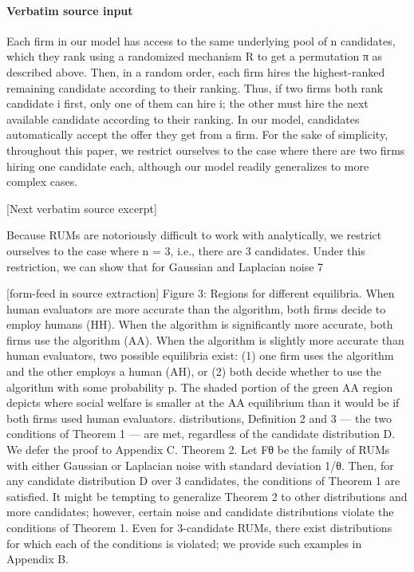 \documentclass[10pt]{article}
\begin{document}
\paragraph{Verbatim source input}
\begin{ReviewVerbatim}
Each firm in our model has access to the same underlying pool of n candidates, which they rank using
a randomized mechanism R to get a permutation π as described above. Then, in a random order, each
firm hires the highest-ranked remaining candidate according to their ranking. Thus, if two firms both rank
candidate i first, only one of them can hire i; the other must hire the next available candidate according to
their ranking. In our model, candidates automatically accept the offer they get from a firm. For the sake
of simplicity, throughout this paper, we restrict ourselves to the case where there are two firms hiring one
candidate each, although our model readily generalizes to more complex cases.

[Next verbatim source excerpt]

Because RUMs are notoriously difficult to work with analytically, we restrict ourselves to the case where
n = 3, i.e., there are 3 candidates. Under this restriction, we can show that for Gaussian and Laplacian noise
7


[form-feed in source extraction]
Figure 3: Regions for different equilibria. When human evaluators are more accurate than the algorithm,
both firms decide to employ humans (HH). When the algorithm is significantly more accurate, both firms
use the algorithm (AA). When the algorithm is slightly more accurate than human evaluators, two possible
equilibria exist: (1) one firm uses the algorithm and the other employs a human (AH), or (2) both decide
whether to use the algorithm with some probability p. The shaded portion of the green AA region depicts
where social welfare is smaller at the AA equilibrium than it would be if both firms used human evaluators.
distributions, Definition 2 and 3 — the two conditions of Theorem 1 — are met, regardless of the candidate
distribution D. We defer the proof to Appendix C.
Theorem 2. Let Fθ be the family of RUMs with either Gaussian or Laplacian noise with standard deviation
1/θ. Then, for any candidate distribution D over 3 candidates, the conditions of Theorem 1 are satisfied.
It might be tempting to generalize Theorem 2 to other distributions and more candidates; however,
certain noise and candidate distributions violate the conditions of Theorem 1. Even for 3-candidate RUMs,
there exist distributions for which each of the conditions is violated; we provide such examples in Appendix B.
\end{ReviewVerbatim}
\end{document}
